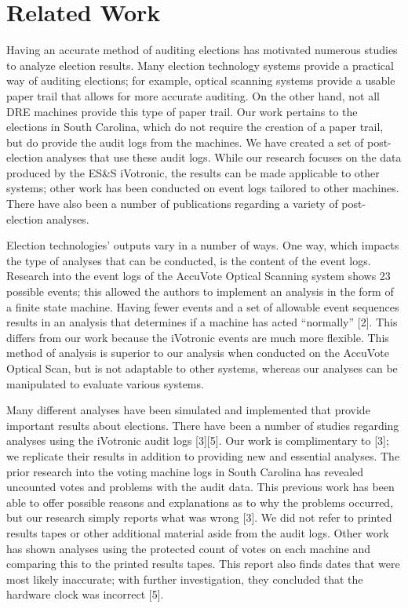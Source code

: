 \documentclass[letterpaper,twocolumn,10pt]{article}
\begin{document}
\section{Related Work}
Having an accurate method of auditing elections has motivated numerous studies to analyze election results.  Many election technology systems provide a practical way of auditing elections; for example, optical scanning systems provide a usable paper trail that allows for more accurate auditing.  On the other hand, not all DRE machines provide this type of paper trail.  Our work pertains to the elections in South Carolina, which do not require the creation of a paper trail, but do provide the audit logs from the machines.  We have created a set of post-election analyses that use these audit logs.  While our research focuses on the data produced by the ES\&S iVotronic, the results can be made applicable to other systems; other work has been conducted on event logs tailored to other machines.  There have also been a number of publications regarding a variety of post-election analyses. 

Election technologies’ outputs vary in a number of ways.  One way, which impacts the type of analyses that can be conducted, is the content of the event logs.  Research into the event logs of the AccuVote Optical Scanning system shows 23 possible events; this allowed the authors to implement an analysis in the form of a finite state machine.  Having fewer events and a set of allowable event sequences results in an analysis that determines if a machine has acted “normally” [2].  This differs from our work because the iVotronic events are much more flexible.  This method of analysis is superior to our analysis when conducted on the AccuVote Optical Scan, but is not adaptable to other systems, whereas our analyses can be manipulated to evaluate various systems.

Many different analyses have been simulated and implemented that provide important results about elections.  There have been a number of studies regarding analyses using the iVotronic audit logs [3][5].  Our work is complimentary to [3]; we replicate their results in addition to providing new and essential analyses.  The prior research into the voting machine logs in South Carolina has revealed uncounted votes and problems with the audit data.  This previous work has been able to offer possible reasons and explanations as to why the problems occurred, but our research simply reports what was wrong [3].  We did not refer to printed results tapes or other additional material aside from the audit logs.  Other work has shown analyses using the protected count of votes on each machine and comparing this to the printed results tapes.  This report also finds dates that were most likely inaccurate; with further investigation, they concluded that the hardware clock was incorrect [5].
\end{document}
